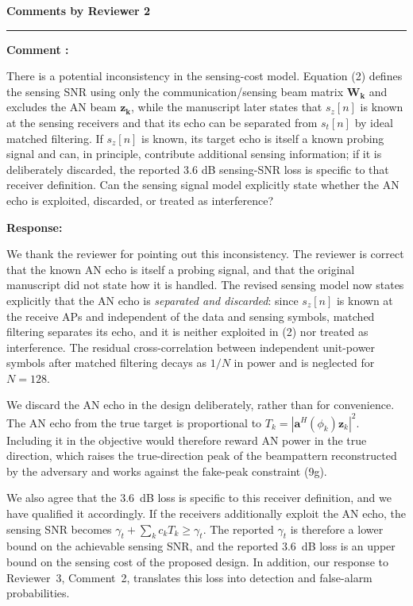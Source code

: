 \documentclass[a4paper,12pt]{article}
\newcounter{reviewcomment}
\newcommand{\reviewer}[1]{%
  \clearpage
  \setcounter{reviewcomment}{0}%
  {\color{blue}\large\bfseries Comments by #1\par}
  {\color{blue}\rule{\linewidth}{0.15em}}\par
}
\newenvironment{reviewcomment}{%
  \stepcounter{reviewcomment}%
  \begin{shaded}
  \textbf{Comment \thereviewcomment:}\par
}{\end{shaded}}
\newenvironment{response}{\par\textbf{Response:}\par}{\par}
\begin{document}
\reviewer{Reviewer 2}
\begin{reviewcomment}
There is a potential inconsistency in the sensing-cost model. Equation (2)
defines the sensing SNR using only the communication/sensing beam matrix
$\mathbf {W_k} $ and excludes the AN beam $\mathbf {z_k} $, while the
manuscript later states that $s_z[n]$ is known at the sensing receivers and
that its echo can be separated from $s_t[n]$ by ideal matched filtering. If
$s_z[n]$ is known, its target echo is itself a known probing signal and can,
in principle, contribute additional sensing information; if it is
deliberately discarded, the reported $3.6$ dB sensing-SNR loss is specific to
that receiver definition. Can the sensing signal model explicitly state
whether the AN echo is exploited, discarded, or treated as interference?
\end{reviewcomment}
\begin{response}
We thank the reviewer for pointing out this inconsistency. The reviewer is
correct that the known AN echo is itself a probing signal, and that the
original manuscript did not state how it is handled. The revised sensing
model now states explicitly that the AN echo is \emph{separated and
discarded}: since $s_z[n]$ is known at the receive APs and independent of the
data and sensing symbols, matched filtering separates its echo, and it is
neither exploited in (2) nor treated as interference. The residual
cross-correlation between independent unit-power symbols after matched
filtering decays as $1/N$ in power and is neglected for $N=128$.

We discard the AN echo in the design deliberately, rather than for
convenience. The AN echo from the true target is proportional to
$T_k=|\mathbf{a}^H(\phi_k)\mathbf{z}_k|^2$. Including it in the objective
would therefore reward AN power in the true direction, which raises the
true-direction peak of the beampattern reconstructed by the adversary and
works against the fake-peak constraint (9g).

We also agree that the $3.6$~dB loss is specific to this receiver
definition, and we have qualified it accordingly. If the receivers
additionally exploit the AN echo, the sensing SNR becomes
$\gamma_t+\sum_kc_kT_k\ge\gamma_t$. The reported $\gamma_t$ is therefore a
lower bound on the achievable sensing SNR, and the reported $3.6$~dB loss is
an upper bound on the sensing cost of the proposed design. In addition, our
response to Reviewer~3, Comment~2, translates this loss into detection and
false-alarm probabilities.
\end{response}
\end{document}
